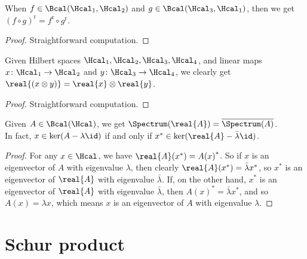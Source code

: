  \begin{lemma}\label{LinearMap.real_comp}\leanok
  When $f\in\Bcal(\Hcal_1,\Hcal_2)$ and $g\in\Bcal(\Hcal_3,\Hcal_1)$, then we get ${(f\circ g)}^{\operatorname{r}}={f^{\operatorname{r}}}\circ{{g^{\operatorname{r}}}}$.
 \end{lemma}
 \begin{proof}\leanok
  Straightforward computation.
 \end{proof}

 \begin{lemma}\label{TensorProduct.map_real}\leanok
  Given Hilbert spaces $\Hcal_1,\Hcal_2,\Hcal_3,\Hcal_4$, and linear maps $x\colon\Hcal_1\to\Hcal_2$ and $y\colon\Hcal_3\to\Hcal_4$, we clearly get $\real{(x\otimes y)}=\real{x}\otimes\real{y}$.
 \end{lemma}
 \begin{proof}\leanok
  Straightforward computation.
 \end{proof}

 \begin{proposition}\label{LinearMap.real.spectrum}
  \leanok
  Given $A\in\Bcal(\Hcal)$, we get $\Spectrum(\real{A})=\overline{\Spectrum(A)}$.\\
  In fact, $x\in\ker(A-\lambda\id)$ if and only if $x^*\in\ker(\real{A}-\bar{\lambda}\id)$.
 \end{proposition}
 \begin{proof}\leanok
  For any $x\in\Hcal$, we have $\real{A}(x^*)={A(x)}^*$. So if $x$ is an eigenvector of $A$ with eigenvalue $\lambda$, then clearly $\real{A}(x^*)=\bar{\lambda}x^*$, so $x^*$ is an eigenvector of $\real{A}$ with eigenvalue $\bar{\lambda}$.
  If, on the other hand, $x^*$ is an eigenvector of $\real{A}$ with eigenvalue $\bar{\lambda}$, then ${A(x)}^*=\bar{\lambda}x^*$, and so $A(x)=\lambda x$, which means $x$ is an eigenvector of $A$ with eigenvalue $\lambda$.
 \end{proof}












\chapter{Schur product}

